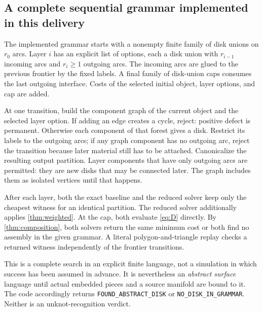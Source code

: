 \documentclass[11pt,a4paper]{article}
\theoremstyle{definition}
\theoremstyle{remark}
\begin{document}
\subsection{A complete sequential grammar implemented in this delivery}
The implemented grammar starts with a nonempty finite family of disk unions on $r_0$ arcs.
Layer $i$ has an explicit list of options, each a disk union with $r_{i-1}$ incoming
arcs and $r_i\ge1$ outgoing arcs. The incoming arcs are glued to the previous frontier
by the fixed labels. A final family of disk-union caps consumes the last outgoing
interface. Costs of the selected initial object, layer options, and cap are added.

At one transition, build the component graph of the current object and the selected
layer option. If adding an edge creates a cycle, reject: positive defect is permanent.
Otherwise each component of that forest gives a disk. Restrict its labels to the
outgoing arcs; if any graph component has no outgoing arc, reject the transition because
later material still has to be attached. Canonicalize the resulting output partition.
Layer components that have only outgoing arcs are permitted: they are new disks that
may be connected later. The graph includes them as isolated vertices until that happens.

After each layer, both the exact baseline and the reduced solver keep only the cheapest
witness for an identical partition. The reduced solver additionally applies
\cref{thm:weighted}. At the cap, both evaluate \eqref{eq:D} directly. By
\cref{thm:composition}, both solvers return the same minimum cost or both find no
assembly in the given grammar. A literal polygon-and-triangle replay checks a returned
witness independently of the frontier transitions.

This is a complete search in an explicit finite language, not a simulation in which
success has been assumed in advance. It is nevertheless an \emph{abstract surface}
language until actual embedded pieces and a source manifold are bound to it. The
code accordingly returns \texttt{FOUND\_ABSTRACT\_DISK} or
\texttt{NO\_DISK\_IN\_GRAMMAR}. Neither is an unknot-recognition verdict.
\end{document}
